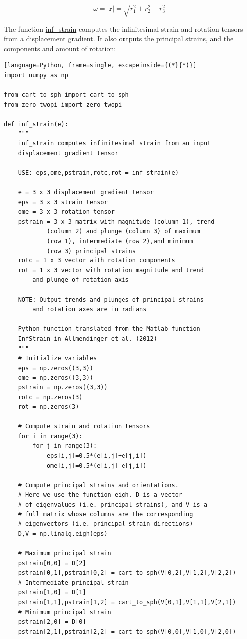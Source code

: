 \documentclass[a4paper , 12pt]{book}
\begin{document}
\begin{equation}
    \omega = \vert \mathbf{r}\vert = \sqrt{r_1^2+r_2^2+r_3^2} 
\end{equation}

The function \href{https://github.com/nfcd/compGeo/blob/master/source/functions/inf_strain.py}{inf\_strain} computes the infinitesimal strain and rotation tensors from a displacement gradient. It also outputs the principal strains, and the components and amount of rotation:

\begin{center}
\begin{lstlisting}[language=Python, frame=single, escapeinside={(*}{*)}]
import numpy as np

from cart_to_sph import cart_to_sph
from zero_twopi import zero_twopi

def inf_strain(e):
	"""
	inf_strain computes infinitesimal strain from an input
	displacement gradient tensor
	
	USE: eps,ome,pstrain,rotc,rot = inf_strain(e)
	
	e = 3 x 3 displacement gradient tensor
	eps = 3 x 3 strain tensor
	ome = 3 x 3 rotation tensor
	pstrain = 3 x 3 matrix with magnitude (column 1), trend
			(column 2) and plunge (column 3) of maximum
			(row 1), intermediate (row 2),and minimum 
			(row 3) principal strains
	rotc = 1 x 3 vector with rotation components
	rot = 1 x 3 vector with rotation magnitude and trend
		and plunge of rotation axis
	
	NOTE: Output trends and plunges of principal strains
		and rotation axes are in radians
	
	Python function translated from the Matlab function
	InfStrain in Allmendinger et al. (2012)
	"""
	# Initialize variables
	eps = np.zeros((3,3))
	ome = np.zeros((3,3))
	pstrain = np.zeros((3,3))
	rotc = np.zeros(3)
	rot = np.zeros(3)
	
	# Compute strain and rotation tensors
	for i in range(3):
		for j in range(3):
			eps[i,j]=0.5*(e[i,j]+e[j,i])
			ome[i,j]=0.5*(e[i,j]-e[j,i])
	
	# Compute principal strains and orientations.
	# Here we use the function eigh. D is a vector
	# of eigenvalues (i.e. principal strains), and V is a
	# full matrix whose columns are the corresponding
	# eigenvectors (i.e. principal strain directions)
	D,V = np.linalg.eigh(eps)
	
	# Maximum principal strain
	pstrain[0,0] = D[2]
	pstrain[0,1],pstrain[0,2] = cart_to_sph(V[0,2],V[1,2],V[2,2])
	# Intermediate principal strain
	pstrain[1,0] = D[1] 
	pstrain[1,1],pstrain[1,2] = cart_to_sph(V[0,1],V[1,1],V[2,1])
	# Minimum principal strain
	pstrain[2,0] = D[0] 
	pstrain[2,1],pstrain[2,2] = cart_to_sph(V[0,0],V[1,0],V[2,0])
	

\end{lstlisting}
\end{center}
\end{document}
